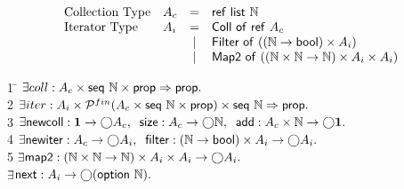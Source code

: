 \documentclass[preprint,natbib]{sigplanconf}
\begin{document}
{\small
\begin{displaymath}
\begin{array}{llcl}
\mbox{Collection Type} & 
A_c & = & \mbox{\textsf{{ref }}}\mbox{\textsf{{list }}}{\mathbb{N}} \\
\mbox{Iterator Type} &
A_i & = & \mbox{\textsf{{Coll of }}}\mbox{\textsf{{ref }}}A_c \\
&   & | & \mbox{\textsf{{Filter of }}}((\mathbb{N} \to \mbox{\textsf{{bool}}}) \times A_i) \\
&   & | & \mbox{\textsf{{Map2 of }}}((\mathbb{N} \times \mathbb{N} \to \mathbb{N}) \times A_i \times A_i) \\
\end{array}
\end{displaymath}
\begin{tabbing}
1 \qquad \= $\exists coll : A_c \times \mbox{\textsf{{seq }}}{\mathbb{N}} \times \mbox{\textsf{{prop}}} \Rightarrow \mbox{\textsf{{prop}}}.$ \\
2 \> 
$\exists iter : A_i \times \mathcal{P}^{fin}(A_c \times \mbox{\textsf{{seq }}}{\mathbb{N}} \times \mbox{\textsf{{prop}}}) \times \mbox{\textsf{{seq }}}{\mathbb{N}} \Rightarrow \mbox{\textsf{{prop}}}.$ \\
3 \> 
$\exists \mbox{\textsf{{newcoll}}} : \mathbf{1} \to \bigcirc{A_c}, \;\;
         \mbox{\textsf{{size}}} : A_c \to \bigcirc{\mathbb{N}}, \;\;
         \mbox{\textsf{{add}}} : A_c \times \mathbb{N} \to \bigcirc{\mathbf{1}}.$\\
4 \> 
$\exists \mbox{\textsf{{newiter}}} : A_c \to \bigcirc{A_i}, \;\;
          \mbox{\textsf{{filter}}} : (\mathbb{N} \to \mbox{\textsf{{bool}}}) \times A_i  \to \bigcirc{A_i}.$ \\
5 \> 
$\exists$\=$ \mbox{\textsf{{map2}}} : (\mathbb{N} \times \mathbb{N} \to \mathbb{N}) \times A_i \times A_i \to \bigcirc{A_i}.$\\
  \>$\exists$\=$\mbox{\textsf{{next}}} : A_i \to \bigcirc{(\mbox{\textsf{{option }}}{\mathbb{N}})}.$  \\[0.5em]


\end{tabbing}}
\end{document}
